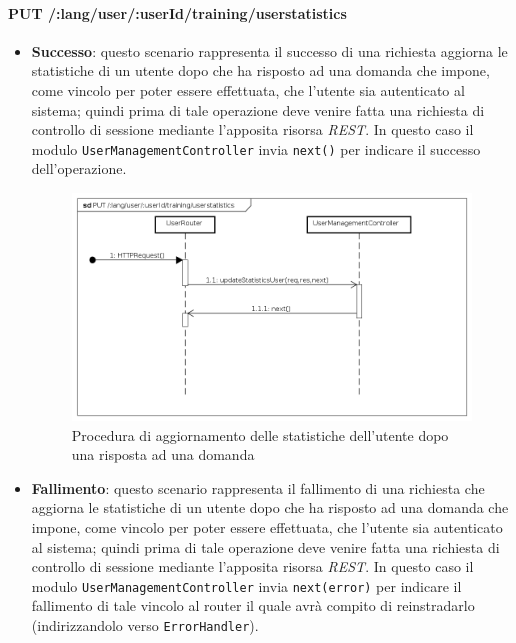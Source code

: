\paragraph{PUT /:lang/user/:userId/training/userstatistics} %
\begin{itemize}
\item \textbf{Successo}: questo scenario rappresenta il successo di una richiesta aggiorna le statistiche di un utente dopo che ha risposto ad una domanda che impone, come vincolo per poter essere effettuata, che l'utente sia autenticato al sistema; quindi prima di tale operazione deve venire fatta una richiesta di controllo di sessione mediante l'apposita risorsa \textit{REST}. In questo caso il modulo \texttt{UserManagementController} invia \texttt{next()} per indicare il successo dell'operazione.

\begin{figure}[ht]
	\centering
	\includegraphics[scale=0.45]{UML/DiagrammiDiSequenza/Back-end/PUT__lang_user__userId_training_userstatistics_success.png}
	\caption{Procedura di aggiornamento delle statistiche dell'utente dopo una risposta ad una domanda}
\end{figure}
\FloatBarrier

\item \textbf{Fallimento}: questo scenario rappresenta il fallimento di una richiesta che aggiorna le statistiche di un utente dopo che ha risposto ad una domanda che impone, come vincolo per poter essere effettuata, che l'utente sia autenticato al sistema; quindi prima di tale operazione deve venire fatta una richiesta di controllo di sessione mediante l'apposita risorsa \textit{REST}. In questo caso il modulo \texttt{UserManagementController} invia \texttt{next(error)} per indicare il fallimento di tale vincolo al router il quale avrà compito di reinstradarlo (indirizzandolo verso \texttt{ErrorHandler}).


\end{itemize}
